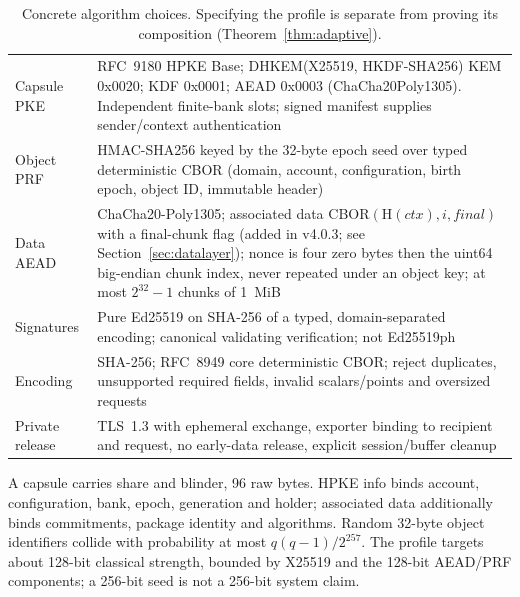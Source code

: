 \documentclass[pdflatex,sn-mathphys-num,twocolumn]{sn-jnl}
\theoremstyle{plain}
\theoremstyle{definition}
\begin{document}
\begin{table}[htbp]
\caption{Concrete algorithm choices. Specifying the profile is separate from proving its composition (Theorem~\ref{thm:adaptive}).}\label{tab:profile}
\centering\footnotesize
\altrows
\begin{tabularx}{\linewidth}{@{}p{.27\linewidth}Y@{}}\toprule
{} & \\\midrule
Capsule PKE & RFC~9180 HPKE Base; DHKEM(X25519, HKDF-SHA256) KEM 0x0020; KDF 0x0001; AEAD 0x0003 (ChaCha20Poly1305). Independent finite-bank slots; signed manifest supplies sender/context authentication~\cite{rfc9180}\\
Object PRF & HMAC-SHA256 keyed by the 32-byte epoch seed over typed deterministic CBOR (domain, account, configuration, birth epoch, object ID, immutable header)\\
Data AEAD & ChaCha20-Poly1305; associated data CBOR$(\mathrm{H}(\mathit{ctx}),i,\mathit{final})$ with a final-chunk flag (added in v4.0.3; see Section~\ref{sec:datalayer}); nonce is four zero bytes then the uint64 big-endian chunk index, never repeated under an object key; at most $2^{32}-1$ chunks of 1~MiB~\cite{rfc8439}\\
Signatures & Pure Ed25519 on SHA-256 of a typed, domain-separated encoding; canonical validating verification; not Ed25519ph~\cite{rfc8032}\\
Encoding & SHA-256; RFC~8949 core deterministic CBOR; reject duplicates, unsupported required fields, invalid scalars/points and oversized requests~\cite{rfc8949}\\
Private release & TLS~1.3 with ephemeral exchange, exporter binding to recipient and request, no early-data release, explicit session/buffer cleanup~\cite{rfc8446}\\\bottomrule
\end{tabularx}
\end{table}

A capsule carries share and blinder, 96 raw bytes. HPKE info binds account, configuration, bank, epoch, generation and holder; associated data additionally binds commitments, package identity and algorithms. Random 32-byte object identifiers collide with probability at most $q(q-1)/2^{257}$. The profile targets about 128-bit classical strength, bounded by X25519 and the 128-bit AEAD/PRF components; a 256-bit seed is not a 256-bit system claim.
\end{document}
